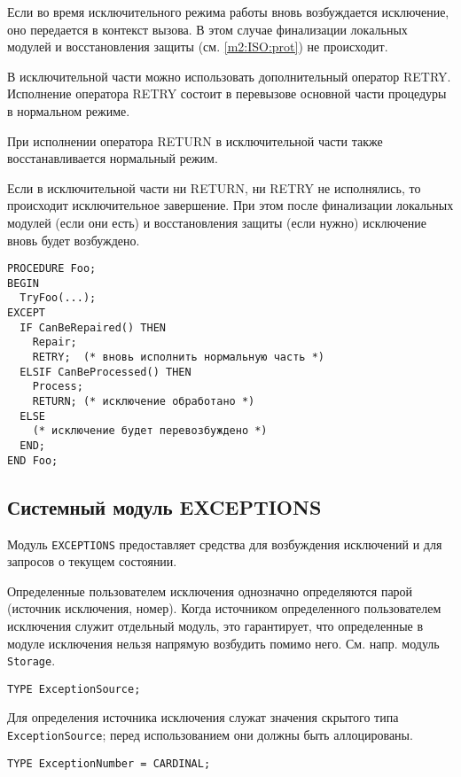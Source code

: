 Если во время исключительного режима работы вновь возбуждается 
исключение, оно передается в контекст вызова. В этом случае 
финализации локальных модулей и восстановления защиты 
(см. \ref{m2:ISO:prot}) не происходит.

В исключительной части можно использовать дополнительный оператор
RETRY. Исполнение оператора RETRY состоит в перевызове основной части 
процедуры в нормальном режиме.

При исполнении оператора RETURN в исключительной части также
восстанавливается нормальный режим.

Если в исключительной части ни RETURN, ни RETRY не исполнялись,
то происходит исключительное завершение. При этом после финализации
локальных модулей (если они есть) и восстановления защиты (если нужно)
исключение вновь будет возбуждено.

\Example
\begin{verbatim}
PROCEDURE Foo;
BEGIN
  TryFoo(...);
EXCEPT
  IF CanBeRepaired() THEN
    Repair;
    RETRY;  (* вновь исполнить нормальную часть *)
  ELSIF CanBeProcessed() THEN
    Process;
    RETURN; (* исключение обработано *)
  ELSE
    (* исключение будет перевозбуждено *)
  END;
END Foo;
\end{verbatim}

\subsection{Системный модуль EXCEPTIONS}

Модуль {\tt EXCEPTIONS} предоставляет средства для 
возбуждения исключений и для запросов о текущем состоянии.

Определенные пользователем исключения однозначно определяются 
парой (источник исключения, номер). Когда источником определенного
пользователем исключения служит отдельный модуль, это гарантирует,
что определенные в модуле исключения нельзя напрямую возбудить
помимо него. См. напр. модуль {\tt Storage}.

\begin{verbatim}
TYPE ExceptionSource;
\end{verbatim}

Для определения источника исключения служат значения
скрытого типа {\tt ExceptionSource}; перед использованием
они должны быть аллоцированы.

\begin{verbatim}
TYPE ExceptionNumber = CARDINAL;
\end{verbatim}

